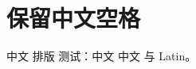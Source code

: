 \documentclass[a4paper,10pt,UTF8,scheme=chinese]{ctexart}
\begin{document}
\section{保留中文空格}
中文 排版 测试：中文 中文 与 Latin。
\end{document}
